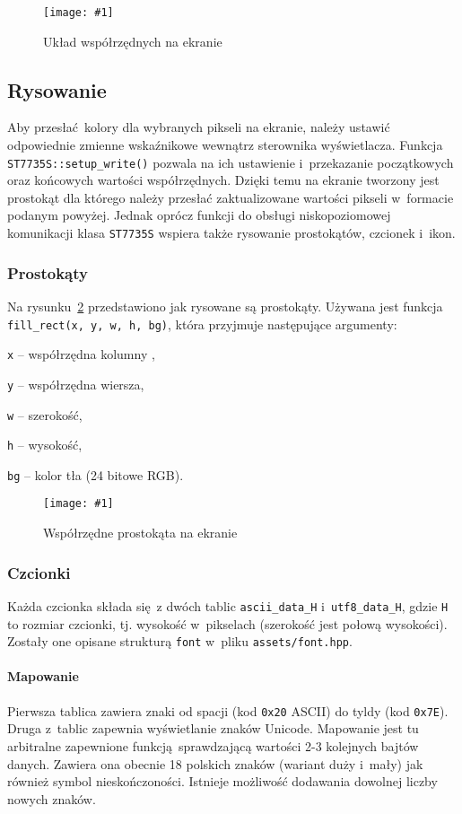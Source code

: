 \documentclass[polish]{aghengthesis}
\let\tempone\itemize
\let\temptwo\enditemize
\renewenvironment{itemize}{\tempone\setlength{\itemsep}{0cm}}{\temptwo}
\newcommand{\imgint}[4]{
	\begin{figure}[{#4}]
		\centering
		\texttt{[image: \#1]}
		\caption{#2}
		\label{#1}
	\end{figure}
}
\newcommand{\imgh}[3]{\imgint{#1}{#2}{#3}{H}}
\begin{document}
		\imgh{3/PicoRadio-screen-xy}{Układ współrzędnych na ekranie}{0.45}
		
		\subsection{Rysowanie}
			Aby przesłać kolory dla wybranych pikseli na ekranie, należy ustawić odpowiednie zmienne wskaźnikowe wewnątrz sterownika wyświetlacza. Funkcja \lstinline|ST7735S::setup_write()| pozwala na ich ustawienie i~przekazanie początkowych oraz końcowych wartości współrzędnych. Dzięki temu na ekranie tworzony jest prostokąt dla którego należy przesłać zaktualizowane wartości pikseli w~formacie podanym powyżej. Jednak oprócz funkcji do obsługi niskopoziomowej komunikacji klasa \lstinline|ST7735S|  wspiera także rysowanie prostokątów, czcionek i~ikon.
			
			\subsubsection{Prostokąty}
				Na rysunku~\ref{3/PicoRadio-screen-rect} przedstawiono jak rysowane są prostokąty. Używana jest funkcja \lstinline|fill_rect(x, y, w, h, bg)|, która przyjmuje następujące argumenty:
				\begin{itemize}
					\item \lstinline|x| -- współrzędna kolumny ,
					\item \lstinline|y| -- współrzędna wiersza,
					\item \lstinline|w| -- szerokość,
					\item \lstinline|h| -- wysokość,
					\item \lstinline|bg| -- kolor tła (24 bitowe RGB).
				\end{itemize}
				
				\imgh{3/PicoRadio-screen-rect}{Współrzędne prostokąta na ekranie}{0.6}
			
			\subsubsection{Czcionki}
				Każda czcionka składa się z dwóch tablic \lstinline|ascii_data_H| i~\lstinline|utf8_data_H|, gdzie \lstinline|H| to rozmiar czcionki, tj. wysokość w~pikselach (szerokość jest połową wysokości). Zostały one opisane strukturą \lstinline|font| w~pliku \lstinline|assets/font.hpp|.
				
				\paragraph{Mapowanie}
					Pierwsza tablica zawiera znaki od spacji (kod \lstinline|0x20| ASCII) do tyldy (kod \lstinline|0x7E|). Druga z~tablic zapewnia wyświetlanie znaków Unicode. Mapowanie jest tu arbitralne zapewnione funkcją sprawdzającą wartości 2-3 kolejnych bajtów danych. Zawiera ona obecnie 18 polskich znaków (wariant duży i~mały) jak również symbol nieskończoności. Istnieje możliwość dodawania dowolnej liczby nowych znaków.
				
\end{document}

